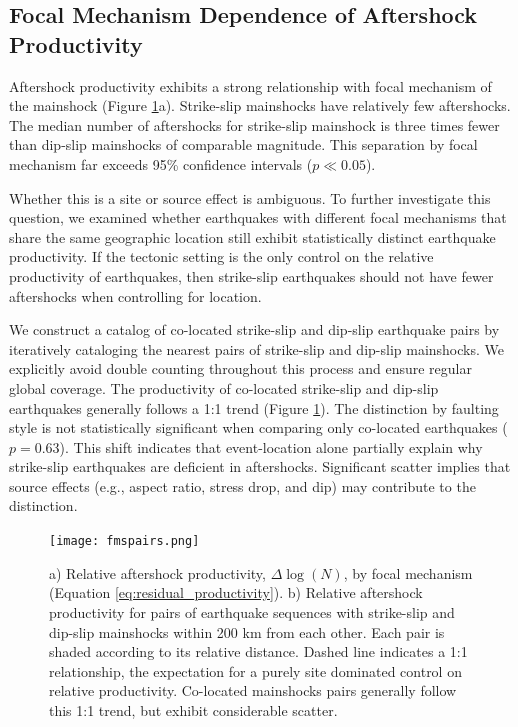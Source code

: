 \documentclass[draft, jgrga]{agujournal2018}
\begin{document}
    \subsection{Focal Mechanism Dependence of Aftershock Productivity}

    Aftershock productivity exhibits a strong relationship with focal mechanism of the mainshock (Figure \ref{fig:coloc}a). Strike-slip mainshocks have relatively few aftershocks. The median number of aftershocks for strike-slip mainshock is three times fewer than dip-slip mainshocks of comparable magnitude. This separation by focal mechanism far exceeds 95\% confidence intervals ($p\ll 0.05$).

    Whether this is a site or source effect is ambiguous. To further investigate this question, we examined whether earthquakes with different focal mechanisms that share the same geographic location still exhibit statistically distinct earthquake productivity. If the tectonic setting is the only control on the relative productivity of earthquakes, then strike-slip earthquakes should not have fewer aftershocks when controlling for location.

    We construct a catalog of co-located strike-slip and dip-slip earthquake pairs by iteratively cataloging the nearest pairs of strike-slip and dip-slip mainshocks. We explicitly avoid double counting throughout this process and ensure regular global coverage. The productivity of co-located strike-slip and dip-slip earthquakes generally follows a 1:1 trend (Figure \ref{fig:coloc}). The distinction by faulting style is not statistically significant when comparing only co-located earthquakes ($p = 0.63$). This shift indicates that event-location alone partially explain why strike-slip earthquakes are deficient in aftershocks. Significant scatter implies that source effects (e.g., aspect ratio, stress drop, and dip) may contribute to the distinction.

    \begin{figure}
        \centering
        \texttt{[image: fmspairs.png]}
        \caption{a) Relative aftershock productivity, $\Delta \log(N)$, by focal mechanism (Equation \ref{eq:residual_productivity}). b) Relative aftershock productivity for pairs of earthquake sequences with strike-slip and dip-slip mainshocks within 200 km from each other. Each pair is shaded according to its relative distance. Dashed line indicates a 1:1 relationship, the expectation for a purely site dominated control on relative productivity. Co-located mainshocks pairs generally follow this 1:1 trend, but exhibit considerable scatter.}
        \label{fig:coloc}
    \end{figure}
\end{document}
